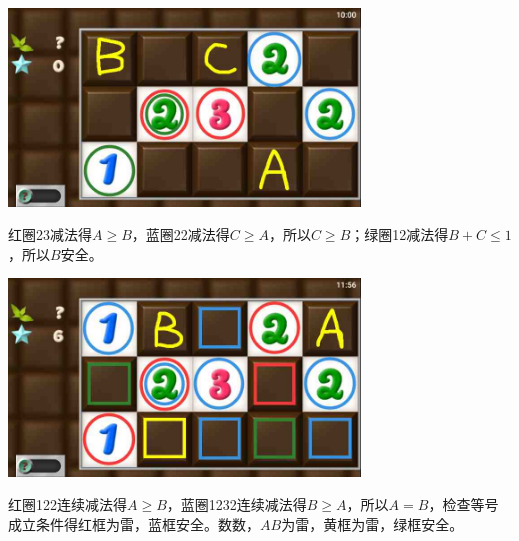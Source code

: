 \subsection{} %
\begin{center}
    \includegraphics[width=0.7\textwidth]{puzzlelow/185-1.jpg}
\end{center}
红圈23减法得$A\ge B$，蓝圈22减法得$C\ge A$，所以$C\ge B$；绿圈12减法得$B+C\le 1$，所以$B$安全。
\begin{center}
    \includegraphics[width=0.7\textwidth]{puzzlelow/185-2.jpg}
\end{center}
红圈122连续减法得$A\ge B$，蓝圈1232连续减法得$B\ge A$，所以$A=B$，检查等号成立条件得红框为雷，蓝框安全。数数，$AB$为雷，黄框为雷，绿框安全。

